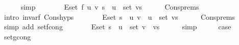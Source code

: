 \begin{isabellebody}
\ \ \ \ \isamarkupfalse%
\ simp\isanewline
\ \ \isamarkupfalse%
\ \isamarkupfalse%
\ {\isachardoublequoteopen}{\isachardot}{\kern0pt}{\isachardot}{\kern0pt}{\isachardot}{\kern0pt}\ {\isacharequal}{\kern0pt}\ E{\isachardot}{\kern0pt}set\ {\isacharparenleft}{\kern0pt}f\ u\ v\ s{\isacharparenright}{\kern0pt}\ {\isasymunion}\ {\isacharbraceleft}{\kern0pt}u{\isacharbraceright}{\kern0pt}\ {\isasymtimes}\ set\ vs{\isachardoublequoteclose}\isanewline
\ \ \ \ \isamarkupfalse%
\ Cons{\isachardot}{\kern0pt}prems\isanewline
\ \ \ \ \isamarkupfalse%
\ {\isacharparenleft}{\kern0pt}intro\ invar{\isacharunderscore}{\kern0pt}f\ Cons{\isachardot}{\kern0pt}hyps{\isacharparenright}{\kern0pt}\isanewline
\ \ \isamarkupfalse%
\ \isamarkupfalse%
\ {\isachardoublequoteopen}{\isachardot}{\kern0pt}{\isachardot}{\kern0pt}{\isachardot}{\kern0pt}\ {\isacharequal}{\kern0pt}\ E{\isachardot}{\kern0pt}set\ s\ {\isasymunion}\ {\isacharbraceleft}{\kern0pt}{\isacharparenleft}{\kern0pt}u{\isacharcomma}{\kern0pt}\ v{\isacharparenright}{\kern0pt}{\isacharbraceright}{\kern0pt}\ {\isasymunion}\ {\isacharbraceleft}{\kern0pt}u{\isacharbraceright}{\kern0pt}\ {\isasymtimes}\ set\ vs{\isachardoublequoteclose}\isanewline
\ \ \ \ \isamarkupfalse%
\ Cons{\isachardot}{\kern0pt}prems\isanewline
\ \ \ \ \isamarkupfalse%
\ {\isacharparenleft}{\kern0pt}simp\ add{\isacharcolon}{\kern0pt}\ set{\isacharunderscore}{\kern0pt}f{\isacharunderscore}{\kern0pt}cong{\isacharparenright}{\kern0pt}\isanewline
\ \ \isamarkupfalse%
\ \isamarkupfalse%
\ {\isachardoublequoteopen}{\isachardot}{\kern0pt}{\isachardot}{\kern0pt}{\isachardot}{\kern0pt}\ {\isacharequal}{\kern0pt}\ E{\isachardot}{\kern0pt}set\ s\ {\isasymunion}\ {\isacharbraceleft}{\kern0pt}u{\isacharbraceright}{\kern0pt}\ {\isasymtimes}\ set\ {\isacharparenleft}{\kern0pt}v\ {\isacharhash}{\kern0pt}\ vs{\isacharparenright}{\kern0pt}{\isachardoublequoteclose}\isanewline
\ \ \ \ \isamarkupfalse%
\ simp\isanewline
\ \ \isamarkupfalse%
\ \isamarkupfalse%
\ {\isacharquery}{\kern0pt}case\isanewline
\ \ \ \ \isacommand{{\isachardot}{\kern0pt}}\isamarkupfalse%
\isanewline
{}\isamarkupfalse%
%
\endisatagproof
{\isafoldproof}%
%
\isadelimproof
%
\endisadelimproof
\isanewline
%
\isadeliminvisible
\isanewline
%
\endisadeliminvisible
%
\isataginvisible
{}\isamarkupfalse%
\ set{\isacharunderscore}{\kern0pt}g{\isacharunderscore}{\kern0pt}cong{\isacharcolon}{\kern0pt}\isanewline

\end{isabellebody}
